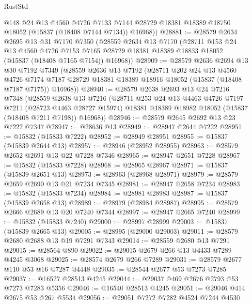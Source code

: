 \begin{lexlean}{RustStd}
\begin{coremodule}
{\begin{coremodule}
{{{{{{{{{{{{{{{{{{{{{{{{{{{{{{{{{{{{{{{{{{{{{{{{{{{{{{{{{{{{        @148
        @24
        @13
        @4560
        @4726
        @7133
        @7144
        @28729
        @18381
        @18389
        @18750
        @18052
        (@15837 (@18408 @7144 @7134))
        @16968))
@28881 := @28579
    @2634
    @2695
    @13
    @31
    @7170
    @7350
    (@28559
      @2634
      @13
      @7170
      (@28711
        @153
        @24
        @13
        @4560
        @4726
        @7153
        @7165
        @28729
        @18381
        @18389
        @18833
        @18052
        (@15837 (@18408 @7165 @7154))
        @16968))
@28909 := @28579
    @2636
    @2694
    @13
    @30
    @7192
    @7349
    (@28559
      @2636
      @13
      @7192
      (@28711
        @202
        @24
        @13
        @4560
        @4726
        @7174
        @7187
        @28729
        @18381
        @18389
        @18916
        @18052
        (@15837 (@18408 @7187 @7175))
        @16968))
@28940 := @28579
    @2638
    @2693
    @13
    @24
    @7216
    @7348
    (@28559
      @2638
      @13
      @7216
      (@28711
        @253
        @24
        @13
        @4463
        @4726
        @7197
        @7211
        (@28723 @4463 @28727 @15974)
        @18381
        @18389
        @18982
        @18052
        (@15837 (@18408 @7211 @7198))
        @16968))
@28946 := @28579 @2645 @2692 @13 @23 @7222 @7347
@28947 := @28636 @13
@28949 := @28947 @2644 @7222
@28951 := @15832 (@15833 @7222)
@28952 := @28949 @28951
@28955 := @15837 (@15839 @2644 @13)
@28957 := @28946 (@28952 @28955)
@28963 := @28579 @2652 @2691 @13 @22 @7228 @7346
@28965 := @28947 @2651 @7228
@28967 := @15832 (@15833 @7228)
@28968 := @28965 @28967
@28971 := @15837 (@15839 @2651 @13)
@28973 := @28963 (@28968 @28971)
@28979 := @28579 @2659 @2690 @13 @21 @7234 @7345
@28981 := @28947 @2658 @7234
@28983 := @15832 (@15833 @7234)
@28984 := @28981 @28983
@28987 := @15837 (@15839 @2658 @13)
@28989 := @28979 (@28984 @28987)
@28995 := @28579 @2666 @2689 @13 @20 @7240 @7344
@28997 := @28947 @2665 @7240
@28999 := @15832 (@15833 @7240)
@29000 := @28997 @28999
@29003 := @15837 (@15839 @2665 @13)
@29005 := @28995 (@29000 @29003)
@29011 := @28579 @2680 @2688 @13 @19 @7291 @7343
@29014 := @28559 @2680 @13 @7291
@29015 := @28564 @890
@29022 := @29015 @2679 @266 @13 @4433 @7289 @4245 @3068
@29025 := @28574 @2679 @266 @7289
@29031 := @28579 @2677 @110 @53 @16 @7287 @4448
@29035 := @28544 @2677 @53 @7273 @7285
@29037 := @16527 @28513 @4245
@29044 := @29037 @469 @2676 @2793 @53 @7273 @7283 @5356
@29046 := @16540 @28513 @4245
@29051 := @29046 @414 @2675 @53 @267 @5534
@29056 := @29051 @7272 @7282 @4524 @7244 @4530
}}}}}}}}}}}}}}}}}}}}}}}}}}}}}}}}}}}}}}}}}}}}}}}}}}}}}}}}}}}}
\end{coremodule}}
\end{coremodule}
\end{lexlean}
